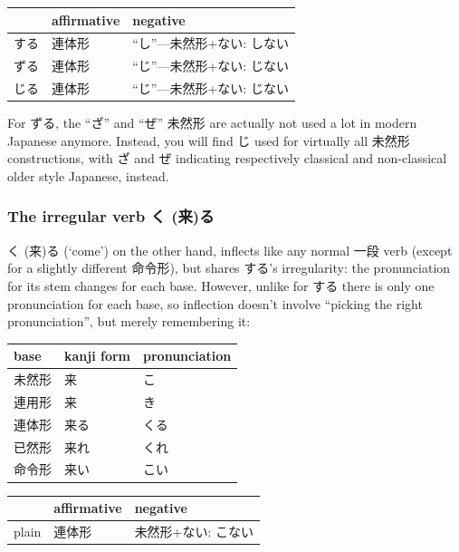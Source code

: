 \documentclass[11pt, b5paper, twoside, openright, onecolumn]{book}
\makeatletter
\newcommand*{\rubystack}[2]{{\relscale{0.5}%
  \begin{tabular}[b]{@{}c@{}}%
    {#1}\\%
   {\textscale{2}{#2}}%
  \end{tabular}}%
}
\DeclareRobustCommand*{\ruby}[2]{%
  \mbox{%
    \setlength{\parskip}{0ex}%
    \BeginAccSupp{method=pdfstringdef,ActualText={#1}}%
      \rubystack{\phantom{#2}}{#1}%
      \llap{%
        \rubystack{#2}{\phantom{#1}}%
      }%
    \EndAccSupp{}%
  }%
}
\renewcommand*{\ruby}[2]{#2 (#1)}%
\newenvironment{mytabular}[1]{\noindent\hspace{0.4in}
\begin{tabular}[h]{#1}}{\end{tabular}}
\makeatother
\begin{document}
\smaller
\begin{mytabular}{| l  l  l |}\hline 
\rule{0pt}{2.4ex} & affirmative & negative\\ 
\hline
\rule{0pt}{2.4ex}する & 連体形 & “し”—未然形+ない: しない\\ 
\rule{0pt}{2.4ex}ずる & 連体形 & “じ”—未然形+ない: じない\\ 
\rule{0pt}{2.4ex}じる & 連体形 & “じ”—未然形+ない: じない\\ 
\hline 
\end{mytabular}
\larger
\vspace{0.5cm}


For ずる‚ the “ざ” and “ぜ” 未然形 are actually not used a lot in modern Japanese anymore. Instead‚ you will find じ used for virtually all 未然形 constructions‚ with ざ and ぜ indicating respectively classical and non-classical older style Japanese‚ instead.

\subsubsection{The irregular verb \ruby{来}{く}る}

\ruby{来}{く}る (‘come’) on the other hand‚ inflects like any normal 一段 verb (except for a slightly different 命令形)‚ but shares する’s irregularity: the pronunciation for its stem changes for each base. However‚ unlike for する there is only one pronunciation for each base‚ so inflection doesn’t involve “picking the right pronunciation”‚ but merely remembering it:

\vspace{0.5cm}
\smaller
\begin{mytabular}{| l  l  l |}\hline 
\rule{0pt}{2.4ex}base & kanji form & pronunciation\\ 
\hline
\rule{0pt}{2.4ex}未然形 & 来 & こ\\ 
\rule{0pt}{2.4ex}連用形 & 来 & き\\ 
\rule{0pt}{2.4ex}連体形 & 来る & くる\\ 
\rule{0pt}{2.4ex}已然形 & 来れ & くれ\\ 
\rule{0pt}{2.4ex}命令形 & 来い & こい\\ 
\hline 
\end{mytabular}
\larger
\vspace{0.5cm}

\smaller
\begin{mytabular}{| l  l  l |}\hline 
\rule{0pt}{2.4ex} & affirmative & negative\\ 
\hline
\rule{0pt}{2.4ex}plain & 連体形 & 未然形+ない: こない\\ 
\hline 
\end{mytabular}
\larger
\vspace{0.5cm}
\end{document}
